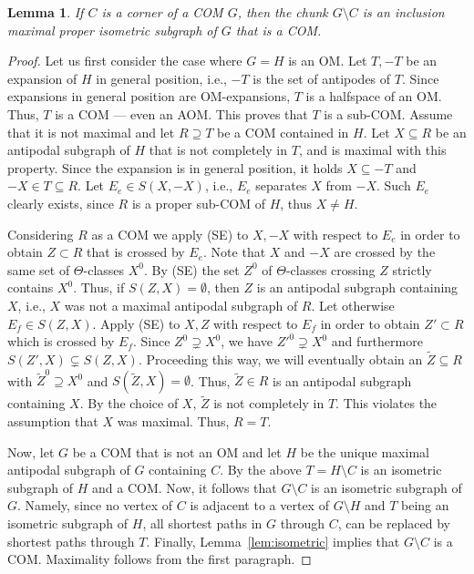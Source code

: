 \documentclass[final,11pt]{article}
\newtheorem{lem}[thm]{Lemma}%
\begin{document}
\begin{lem}\label{lem:cornerisweakcorner+peeling}
 If $C$ is a corner of a COM $G$, then the chunk $G\setminus C$ is an inclusion maximal proper isometric subgraph of $G$ that is a COM. 
\end{lem}
\begin{proof}
Let us first consider the case where $G=H$ is an OM.
 Let $T, -T$ be an expansion of $H$ in general position, i.e., $-T$ is the set of antipodes of $T$. Since expansions in general position are OM-expansions, $T$ is a halfspace of an OM. Thus, $T$ is a COM --- even an AOM. 
This proves that $T$ is a sub-COM. Assume that it is not maximal and let $R\supseteq T$ be a COM contained in $H$. Let $X\subseteq R$ be an antipodal subgraph of $H$ that is not completely in $T$, and  is maximal with this property. Since the expansion is in general position, it holds $X \subseteq -T$ and $-X\in T \subseteq R$. Let $E_e\in S(X,-X)$, i.e., $E_e$ separates $X$ from $-X$. Such $E_e$ clearly exists, since $R$ is a proper sub-COM of $H$, thus $X\neq H$.

Considering $R$ as a COM we apply (SE) to $X,-X$ with respect to $E_e$ in order to obtain $Z\subset R$ that is crossed by $E_e$.  Note that $X$ and $-X$ are crossed by the same set of $\Theta$-classes $X^0$. By (SE) the set $Z^0$ of $\Theta$-classes crossing $Z$ strictly contains $X^0$. Thus, if $S(Z,X)=\emptyset$, then $Z$ is an antipodal subgraph containing $X$, i.e., $X$ was not a maximal antipodal subgraph of $R$. Let otherwise $E_f\in S(Z,X)$. Apply (SE) to $X,Z$ with respect to $E_f$ in order to obtain $Z'\subset R$ which is crossed by $E_f$. Since $Z^0\supsetneq X^0$, we have $Z'^0\supsetneq X^0$ and furthermore $S(Z',X)\subsetneq S(Z,X)$. Proceeding this way, we will eventually obtain an $\widetilde{Z}\subseteq R$ with $\widetilde{Z}^0\supseteq X^0$ and $S(\widetilde{Z},X)=\emptyset$. Thus, $\widetilde{Z}\in R$ is an antipodal subgraph containing $X$. By the choice of $X$, $\widetilde{Z}$ is not completely in $T$. This violates the assumption that $X$ was maximal. Thus, $R=T$.
 
 Now, let $G$ be a COM that is not an OM and let $H$ be the unique maximal antipodal subgraph of $G$ containing $C$. By the above $T=H\setminus C$ is an isometric subgraph of $H$ and a COM. Now, it follows that $G\setminus C$ is an isometric subgraph of $G$. Namely, since no vertex of $C$ is adjacent to a vertex of $G\setminus H$ and $T$ being an isometric subgraph of $H$, all shortest paths in $G$ through $C$, can be replaced by shortest paths through $T$. 
 Finally, Lemma~\ref{lem:isometric} implies that $G\setminus C$  is a COM. {Maximality follows from the first paragraph.}
\end{proof}
\end{document}
